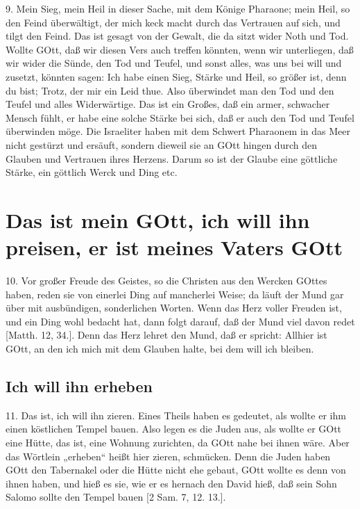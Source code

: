 9. Mein Sieg, mein Heil in dieser Sache, mit dem Könige Pharaone; mein Heil, so den Feind überwältigt, der mich keck macht durch das Vertrauen auf sich, und tilgt den Feind. Das ist gesagt von der Gewalt, die da sitzt wider Noth und Tod. Wollte GOtt, daß wir diesen Vers auch treffen könnten, wenn wir unterliegen, daß wir wider die Sünde, den Tod und Teufel, und sonst alles, was uns bei will und zusetzt, könnten sagen: Ich habe einen Sieg, Stärke und Heil, so größer ist, denn du bist; Trotz, der mir ein Leid thue. Also überwindet man den Tod und den Teufel und alles Widerwärtige. Das ist ein Großes, daß ein armer, schwacher Mensch fühlt, er habe eine solche Stärke bei sich, daß er auch den Tod und Teufel überwinden möge. Die Israeliter haben mit dem Schwert Pharaonem in das Meer nicht gestürzt und ersäuft, sondern dieweil sie an GOtt hingen durch den Glauben und Vertrauen ihres Herzens. Darum so ist der Glaube eine göttliche Stärke, ein göttlich Werck und Ding etc.

\section[Das ist mein GOtt, ich will ihn preisen, er]{Das ist mein GOtt, ich will ihn preisen, er ist meines Vaters GOtt}

10. Vor großer Freude des Geistes, so die Christen aus den Wercken GOttes haben, reden sie von einerlei Ding auf mancherlei Weise; da
läuft der Mund gar über mit ausbündigen, sonderlichen Worten. Wenn das Herz voller Freuden ist, und ein Ding wohl bedacht hat, dann folgt darauf, daß der Mund viel davon redet [Matth. 12, 34.]. Denn das Herz lehret den Mund, daß er spricht: Allhier ist GOtt, an den ich mich mit dem Glauben halte, bei dem will ich bleiben.

\subsection{Ich will ihn erheben}

11. Das ist, ich will ihn zieren. Eines Theils haben es gedeutet, als wollte er ihm einen köstlichen Tempel bauen. Also legen es die Juden aus, als wollte er GOtt eine Hütte, das ist, eine Wohnung zurichten, da GOtt nahe bei ihnen wäre. Aber das Wörtlein „erheben“ heißt hier zieren, schmücken. Denn die Juden haben GOtt den Tabernakel oder die Hütte nicht ehe gebaut, GOtt wollte es denn von ihnen haben, und hieß es sie, wie er es hernach den David hieß, daß sein Sohn Salomo sollte den Tempel bauen [2 Sam. 7, 12. 13.].

